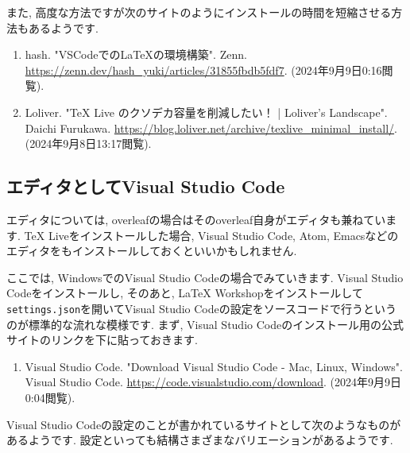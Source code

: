 \documentclass[10pt,a4paper]{jsarticle}
\begin{document}
また, 高度な方法ですが次のサイトのようにインストールの時間を短縮させる方法もあるようです. 
\begin{enumerate}
    \renewcommand{\labelenumi}{[\arabic{enumi}]\ }
    \setcounter{enumi}{18}
    \item hash. "VSCodeでのLaTeXの環境構築". Zenn. \url{https://zenn.dev/hash_yuki/articles/31855fbdb5fdf7}. (2024年9月9日0:16閲覧). 
    \item Loliver. "TeX Live のクソデカ容量を削減したい！ | Loliver's Landscape". Daichi Furukawa. \url{https://blog.loliver.net/archive/texlive_minimal_install/}. (2024年9月8日13:17閲覧). 
\end{enumerate}
\subsection{エディタとしてVisual Studio Code}
エディタについては, overleafの場合はそのoverleaf自身がエディタも兼ねています. TeX Liveをインストールした場合, Visual Studio Code, Atom, Emacsなどのエディタをもインストールしておくといいかもしれません. \par
ここでは, WindowsでのVisual Studio Codeの場合でみていきます. Visual Studio Codeをインストールし, そのあと, LaTeX Workshopをインストールして\verb|settings.json|を開いてVisual Studio Codeの設定をソースコードで行うというのが標準的な流れな模様です. まず, Visual Studio Codeのインストール用の公式サイトのリンクを下に貼っておきます. 
\begin{enumerate}
    \renewcommand{\labelenumi}{[\arabic{enumi}]\ }
    \setcounter{enumi}{20}
    \item Visual Studio Code. "Download Visual Studio Code - Mac, Linux, Windows". Visual Studio Code. \url{https://code.visualstudio.com/download}. (2024年9月9日0:04閲覧). 
\end{enumerate}
Visual Studio Codeの設定のことが書かれているサイトとして次のようなものがあるようです. 設定といっても結構さまざまなバリエーションがあるようです. 
\end{document}
